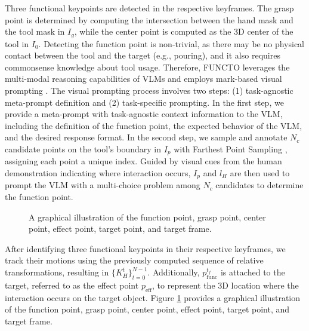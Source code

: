 Three functional keypoints are detected in the respective keyframes. The grasp point is determined by computing the intersection between the hand mask and the tool mask in $I_g$, while the center point is computed as the 3D center of the tool in $I_0$. Detecting the function point is non-trivial, as there may be no physical contact between the tool and the target (e.g., pouring), and it also requires commonsense knowledge about tool usage. Therefore, FUNCTO leverages the multi-modal reasoning capabilities of VLMs and employs mark-based visual prompting \cite{nasirianypivot}. The visual prompting process involves two steps: (1) task-agnostic meta-prompt definition and (2) task-specific prompting. In the first step, we provide a meta-prompt with task-agnostic context information to the VLM, including the definition of the function point, the expected behavior of the VLM, and the desired response format. In the second step, we sample and annotate $N_c$ candidate points on the tool's boundary in $I_{p}$ with Farthest Point Sampling \cite{qi2017pointnet}, assigning each point a unique index. Guided by visual cues from the human demonstration indicating where interaction occurs, $I_{p}$ and $l_H$ are then used to prompt the VLM with a multi-choice problem among $N_c$ candidates to determine the function point.

\begin{figure}[t]
  \centering
  \vspace*{-0.2in}
    \vspace*{-0.2in}
  \caption{A graphical illustration of the function point, grasp point, center point, effect point, target point, and target frame.}
  \label{fig:point_frame_def}
  \vspace*{-0.2in}
\end{figure}

After identifying three functional keypoints in their respective keyframes, we track their motions using the previously computed sequence of relative transformations, resulting in $\{K_H^t\}_{t=0}^{N-1}$. Additionally, $p_{\text{func}}^{t_f}$ is attached to the target, referred to as the effect point $p_{\text{eff}}$, to represent the 3D location where the interaction occurs on the target object. Figure \ref{fig:point_frame_def} provides a graphical illustration of the function point, grasp point, center point, effect point, target point, and target frame.


